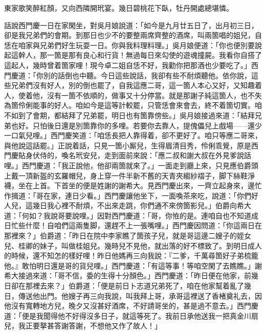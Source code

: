 東家歌笑醉紅顏，又向西隣開玳宴。幾日碧桃花下臥，牡丹開處總堪憐。

話說西門慶一日在家閑坐，對吳月娘說道：「如今是九月廿五日了，出月初三日，卻是我兄弟們的會期。到那日也少不的要整兩席齊整的酒席，叫兩箇唱的姐兒，自恁在咱家與兄弟們好生玩耍一日。你與我料理料理。」吳月娘便道：「你也便別要說起這幹人，那一箇是那有良心和行貨！無過每日來勾使的遊魂撞屍。我看你自搭了這起人，幾時曾着箇家哩！{}現今卓二姐自恁不好，我勸你把那酒也少要吃了。」西門慶道：「你別的話倒也中聽。今日這些說話，我卻有些不耐煩聽他。依你說，這些兄弟們沒有好人，別的倒也罷了，自我這應二哥，這一箇人本心又好，又知趣着人，{}使着他，沒有一箇不依順的，做事又十分停當。就是那謝子純這箇人，也不失為箇伶俐能事的好人。咱如今是這等計較罷，只管恁會來會去，終不着箇切實。咱不如到了會期，都結拜了兄弟罷，明日也有箇靠傍些。」吳月娘接過來道：「結拜兄弟也好。只怕後日還是別箇靠你的多哩。若要你去靠人，提傀儡兒上戲場——還少一口氣兒哩。」西門慶笑道：「咱恁長把人靠得着，卻不更好了。咱只等應二哥來，與他說這話罷。」正說着話，只見一箇小厮兒，生得眉清目秀，伶俐乖覺，原是西門慶貼身伏侍的，喚名玳安兒，走到面前來說：「應二叔和謝大叔在外見爹說話哩。」西門慶道：「我正說他，他卻兩箇就來了。」一面走到廳上來，只見應伯爵頭上戴一頂新盔的玄羅帽兒，身上穿一件半新不舊的天青夾縐紗褶子，脚下絲鞋淨襪，坐在上首。下首坐的便是姓謝的謝希大。見西門慶出來，一齊立起身來，邊忙作揖道：「哥在家，連日少看。」西門慶讓他坐下，一面喚茶來吃，說道：「你們好人兒，這幾日我心裡不耐煩，不出來走跳，你們通不來傍箇影兒。」伯爵向希大道：「何如？我說哥要說哩。」因對西門慶道：「哥，你恠的是。連咱自也不知道成日忙些什麼！自咱們這兩隻脚，還趕不上一張嘴哩。」西門慶因問道：「你這兩日在那裡來？」伯爵道：「昨日在院中李家瞧了箇孩子兒，就是哥這邊二嫂子的姪女兒、桂卿的妹子，叫做桂姐兒。幾時兒不見他，就出落的好不標致了。到明日成人的時候，還不知怎的樣好哩！昨日他媽再三向我說：『二爹，千萬尋箇好子弟梳籠他。』敢怕明日還是哥的貨兒哩。」{}西門慶道：「有這等事！等咱空閑了去瞧瞧。」謝希大接過來道：「哥不信，委的生得十分顏色。」西門慶道：「昨日便在他家，前幾日卻在那裡去來？」伯爵道：「便是前日卜志道兄弟死了，咱在他家幫着亂了幾日，傳送他出門。{}他嫂子再三向我說，叫我拜上哥，承哥這裡送了香楮奠礼去，因他沒有寬轉地方兒，晚夕又沒甚好酒席，不好請哥坐的，甚是過不意去。」西門慶道：「便是我聞得他不好得沒多日子，就這等死了。我前日承他送我一把真金川扇兒，我正要拏甚答謝答謝，不想他又作了故人！」

